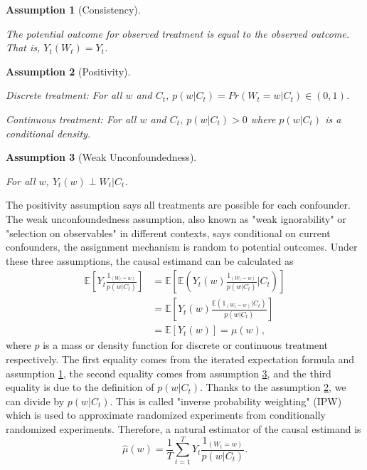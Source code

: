 \documentclass[12pt]{article}
\newtheorem{asm}{Assumption}
\begin{document}
\begin{asm}[Consistency]\label{asm:consistency}\hfill

	The potential outcome for observed treatment is equal to the observed outcome.
	That is, $Y_t(W_t) = Y_t$.
\end{asm}

\begin{asm}[Positivity]\label{asm:positivity}\hfill

	Discrete treatment:
	For all $w$ and $C_t$, $p(w\lvert C_t) = Pr\left ( W_t = w \lvert C_t\right ) \in (0, 1)$.

	Continuous treatment:
	For all $w$ and $C_t$, $p(w\lvert C_t) > 0$ where $p(w\lvert C_t)$ is a conditional density.
\end{asm}


\begin{asm}[Weak Unconfoundedness]\label{asm:unconfoundedness} \hfill

	For all $w$, $Y_{t}(w) \perp W_t \lvert C_t$.
\end{asm}


The positivity assumption says all treatments are possible for each confounder.
The weak unconfoundedness assumption, 
also known as "weak ignorability" or "selection on observables" in different contexts, says
conditional on current confounders, the assignment mechanism is random to potential outcomes.
Under these three assumptions, the causal estimand can be calculated as
\[
	\begin{split}
		\mathbb{E}\left[ Y_t\frac{1_{(W_t = w)}}{p(w\lvert C_t)} \right]
		& = \mathbb{E}\left[ \mathbb{E}\left( Y_t(w) \frac{1_{(W_t = w)}}{p(w\lvert C_t)} \lvert C_t\right)\right]\\
		& = \mathbb{E}\left[ Y_t(w)\frac{\mathbb{E}\left( 1_{(W_t = w)}\lvert C_t \right)}{p(w\lvert C_t)} \right]\\
		& = \mathbb{E}\left[ Y_t(w) \right] = \mu(w),
	\end{split}
\]
where $p$ is a mass or density function for discrete or continuous treatment respectively.
The first equality comes from the iterated expectation formula and assumption \ref{asm:consistency},
the second equality comes from assumption \ref{asm:unconfoundedness},
and the third equality is due to the definition of $p(w\lvert C_t)$.
Thanks to the assumption \ref{asm:positivity}, we can divide by $p(w\lvert C_t)$.
This is called "inverse probability weighting" (IPW)
which is used to approximate randomized experiments from conditionally randomized experiments.
Therefore, a natural estimator of the causal estimand is
\[
	\hat{\mu}(w) = \frac{1}{T}\sum_{t = 1}^T Y_t \frac{1_{(W_t = w)}}{p(w\lvert C_t)}.
\]
\end{document}
